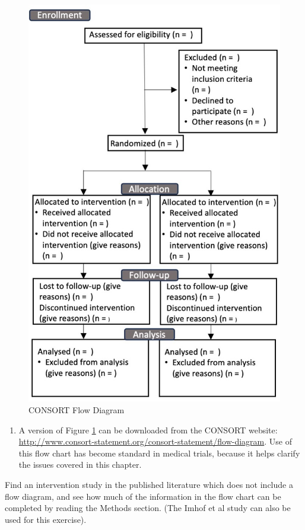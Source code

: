 \documentclass{krantz}
\providecommand{\tightlist}{%
\setlength{\itemsep}{0pt}\setlength{\parskip}{0pt}}
\begin{document}
\begin{figure}
\includegraphics[width=0.9\linewidth]{images_bw/consort} \caption{CONSORT Flow Diagram}\label{fig:consortfig}
\end{figure}

\begin{enumerate}
\def\labelenumi{\arabic{enumi}.}
\setcounter{enumi}{1}
\tightlist
\item
  A version of Figure \ref{fig:consortfig} can be downloaded from the CONSORT website: \url{http://www.consort-statement.org/consort-statement/flow-diagram}. Use of this flow chart has become standard in medical trials, because it helps clarify the issues covered in this chapter.
\end{enumerate}

Find an intervention study in the published literature which does not include a flow diagram, and see how much of the information in the flow chart can be completed by reading the Methods section. (The Imhof et al study can also be used for this exercise).
\end{document}
